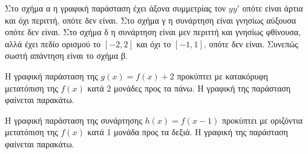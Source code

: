 \begin{alist}
\item Στο σχήμα α η γραφική παράσταση έχει άξονα συμμετρίας τον $yy'$ οπότε είναι άρτια και όχι περιττή, οπότε δεν είναι. Στο σχήμα γ η συνάρτηση είναι γνησίως αύξουσα οπότε δεν είναι. Στο σχήμα δ η συνάρτηση είναι μεν περιττή και γνησίως φθίνουσα, αλλά έχει πεδίο ορισμού το $[-2, 2]$ και όχι το $[-1, 1]$, οπότε δεν είναι.
Συνεπώς σωστή απάντηση είναι το σχήμα β.
\item Η γραφική παράσταση της $g(x) = f(x) + 2$ προκύπτει με κατακόρυφη μετατόπιση της $f(x)$ κατά 2 μονάδες προς τα πάνω. Η γραφική της παράσταση φαίνεται παρακάτω.
\begin{center}
\end{center}
\item Η γραφική παράσταση της συνάρτησης $h(x) = f(x - 1)$ προκύπτει με οριζόντια μετατόπιση της $f(x)$ κατά 1 μονάδα προς τα δεξιά. Η γραφική της παράσταση φαίνεται παρακάτω.
\begin{center}
\end{center}
\end{alist}

